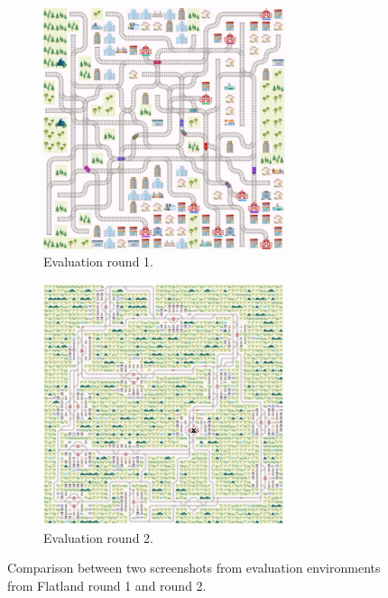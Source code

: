 \begin{figure}[H]
	\centering
	\begin{subfigure}{.5\textwidth}
		\centering
		\includegraphics[width=200pt]{images/example_eval_round1.png}
		\caption{Evaluation round 1.}
		\label{fig:eval_round1}
	\end{subfigure}%
	\begin{subfigure}{.5\textwidth}
		\centering
		\includegraphics[width=200pt]{images/example_eval_round2.png}
		\caption{Evaluation round 2.}
		\label{fig:eval_round2}
	\end{subfigure}
	\caption{Comparison between two screenshots from evaluation environments from Flatland round 1 and round 2.}
	\label{fig:eval_comp}
\end{figure}

